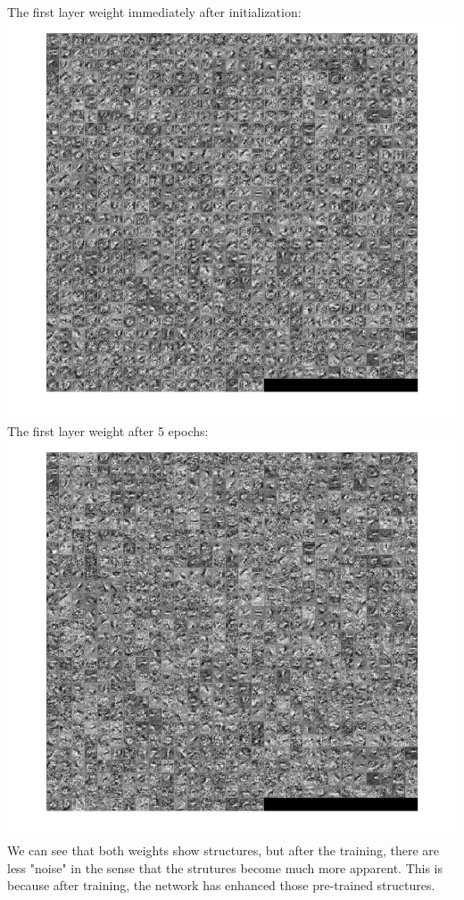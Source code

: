\documentclass[12pt,letterpaper,boxed]{hmcpset}
\begin{document}
\begin{solution}
The first layer weight immediately after initialization:\\
\includegraphics[width=\textwidth]{3_2_2_1.png}\\
\newpage
The first layer weight after 5 epochs:\\
\includegraphics[width=\textwidth]{3_2_2_2.png}\\
We can see that both weights show structures, but after the training, there are less "noise" in the 
sense that the strutures become much more apparent. This is because after training, the 
network has enhanced those pre-trained structures.
\end{solution}
\newpage
\end{document}
